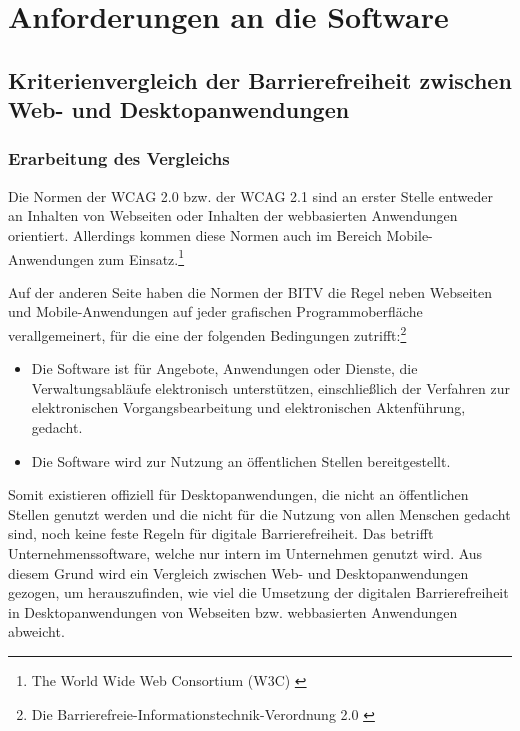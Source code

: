 \section{Anforderungen an die Software}

\subsection{Kriterienvergleich der Barrierefreiheit zwischen Web- und Desktopanwendungen}
\label{subsec: Kriterienvergleich der Barrierefreiheit zwischen Web- und Desktopanwendungen}

\subsubsection{Erarbeitung des Vergleichs}

Die Normen der \ac{WCAG} 2.0 bzw. der \ac{WCAG} 2.1 sind an erster Stelle entweder an Inhalten von Webseiten oder Inhalten der webbasierten Anwendungen orientiert. Allerdings kommen diese Normen auch im Bereich Mobile-Anwendungen zum Einsatz.\footnote{The World Wide Web Consortium (W3C) \cite{w3c}}

Auf der anderen Seite haben die Normen der \ac{BITV} die Regel neben Webseiten und Mobile-Anwendungen auf jeder grafischen Programmoberfläche verallgemeinert, für die eine der folgenden Bedingungen zutrifft:\footnote{Die Barrierefreie-Informationstechnik-Verordnung 2.0 \cite{BITV}}

\begin{itemize}
	\item Die Software ist für Angebote, Anwendungen oder Dienste, die Verwaltungsabläufe elektronisch unterstützen, einschließlich der Verfahren zur elektronischen Vorgangsbearbeitung 
	und elektronischen Aktenführung, gedacht.
	\item Die Software wird zur Nutzung an öffentlichen Stellen bereitgestellt.
\end{itemize}

Somit existieren offiziell für Desktopanwendungen, die nicht an öffentlichen Stellen genutzt werden und die nicht für die Nutzung von allen Menschen gedacht sind, noch keine feste Regeln für digitale Barrierefreiheit. Das betrifft Unternehmenssoftware, welche nur intern im Unternehmen genutzt wird. Aus diesem Grund wird ein Vergleich zwischen Web- und Desktopanwendungen gezogen, um herauszufinden, wie viel die Umsetzung der digitalen Barrierefreiheit in Desktopanwendungen von Webseiten bzw. webbasierten Anwendungen abweicht.

